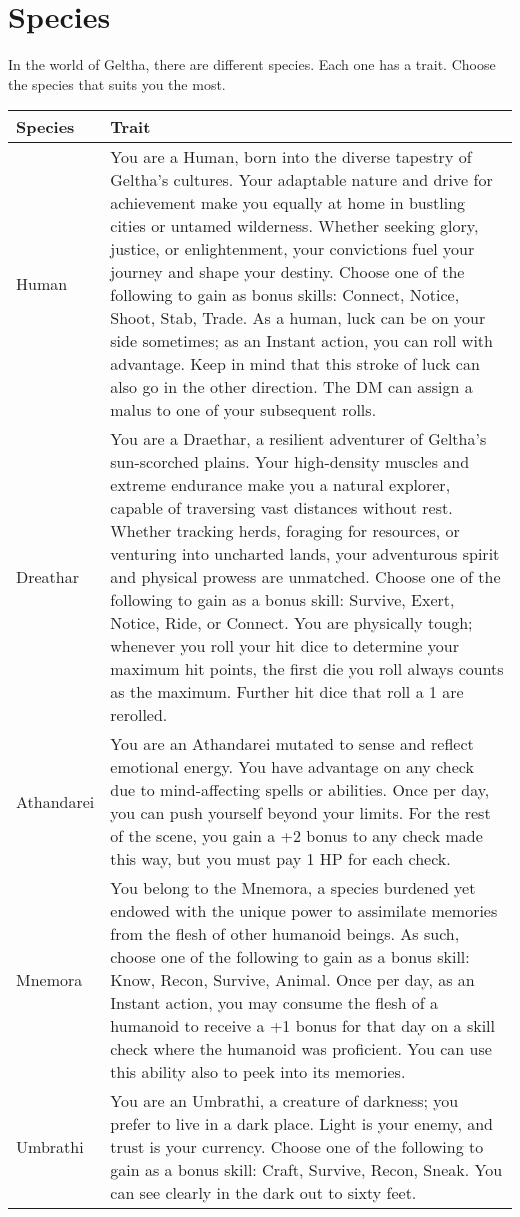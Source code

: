 \documentclass[itdr/core]{subfiles}
\begin{document}
\section{Species} %
\label{sec:species}
In the world of Geltha, there are different species. Each one has a trait. Choose the species that suits you the most.
\begin{longtable}{p{}p{}}
\hline
\textbf{Species} & \textbf{Trait} \\
\hline
Human &   You are a Human, born into the diverse tapestry of Geltha's cultures. Your adaptable nature and drive for achievement make you equally at home in bustling cities or untamed wilderness. Whether seeking glory, justice, or enlightenment, your convictions fuel your journey and shape your destiny. Choose one of the following to gain as bonus skills: Connect, Notice, Shoot, Stab, Trade. As a human, luck can be on your side sometimes; as an Instant action, you can roll with advantage. Keep in mind that this stroke of luck can also go in the other direction. The DM can assign a malus to one of your subsequent rolls. \\ 
Dreathar & You are a Draethar, a resilient adventurer of Geltha’s sun-scorched plains. Your high-density muscles and extreme endurance make you a natural explorer, capable of traversing vast distances without rest. Whether tracking herds, foraging for resources, or venturing into uncharted lands, your adventurous spirit and physical prowess are unmatched. Choose one of the following to gain as a bonus skill: Survive, Exert, Notice, Ride, or Connect. You are physically tough; whenever you roll your hit
dice to determine your maximum hit points, the first
die you roll always counts as the maximum. Further
hit dice that roll a 1 are rerolled. \\ 
Athandarei & You are an Athandarei mutated to sense and reflect emotional energy. You have advantage on any check due to mind-affecting spells or abilities. Once per day, you can push yourself beyond your limits. For the rest of the scene, you gain a +2 bonus to any check made this way, but you must pay 1 HP for each check.\\ 
Mnemora & You belong to the Mnemora, a species burdened yet endowed with the unique power to assimilate memories from the flesh of other humanoid beings. As such, choose one of the following to gain as a bonus skill: Know, Recon, Survive, Animal. Once per day, as an Instant action, you may consume the flesh of a humanoid to receive a +1 bonus for that day on a skill check where the humanoid was proficient. You can use this ability also to peek into its memories. \\
Umbrathi & You are an Umbrathi, a creature of darkness; you prefer to live in a dark place. Light is your enemy, and trust is your currency. Choose one of the following to gain as a bonus skill: Craft, Survive, Recon, Sneak.  You can see clearly in the dark out to sixty feet.  \\ 
\hline 
\end{longtable}
\end{document}
